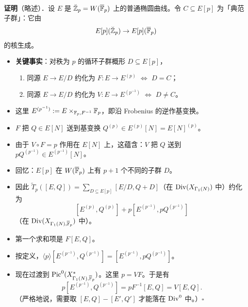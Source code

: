 \noindent\textbf{证明}（略述）．设 $E$ 是 $\breve{\mathbb{Z}}_p=W(\overline{\mathbb{F}}_p)$ 上的普通椭圆曲线。令 $C\subseteq E[p]$ 为「典范子群」：它由
\[
E[p](\breve{\mathbb{Z}}_p)\to E[p](\overline{\mathbb{F}}_p)
\]
的核生成。

\begin{itemize}
\item \textbf{关键事实}：对秩为 $p$ 的循环子群概形 $D\subseteq E[p]$，
\begin{enumerate}
\item[(1)] 同源 $E\to E/D$ 约化为 $F\colon E\to E^{(p)}$ $\iff$ $D=C$；
\item[(2)] 同源 $E\to E/D$ 约化为 $V\colon E\to E^{(p^{-1})}$ $\iff$ $D\ne C$。
\end{enumerate}
\item 这里 $E^{(p^{-1})}:=E\times_{\mathbb{F}_p,F^{-1}}\mathbb{F}_p$，即沿 Frobenius 的逆作基变换。
\item $F$ 把 $Q\in E[N]$ 送到基变换 $Q^{(p)}\in E^{(p)}[N]=E[N]^{(p)}$。
\item 由于 $V\circ F=p$ 作用在 $E[N]$ 上，这蕴含：$V$ 把 $Q$ 送到 $pQ^{(p^{-1})}\in E^{(p^{-1})}[N]$。
\item 回忆：$E[p]$ 在 $W(\overline{\mathbb{F}}_p)$ 上有 $p+1$ 个不同的子群 $D$。
\item 因此 $\tilde T_p([E,Q])=\sum_{D\subseteq E[p]}[E/D,Q+D]$（在 $\operatorname{Div}(X_{\Gamma_1(N)})$ 中）约化为
\[
[E^{(p)},Q^{(p)}]+p[E^{(p^{-1})},pQ^{(p^{-1})}]
\]
（在 $\operatorname{Div}(X_{\Gamma_1(N),\overline{\mathbb{F}}_p})$ 中）。
\item 第一个求和项是 $F[E,Q]$。
\item 按定义，$\langle p\rangle[E^{(p^{-1})},Q^{(p^{-1})}]=[E^{(p^{-1})},pQ^{(p^{-1})}]$。
\item 现在过渡到 $\operatorname{Pic}^0(X^*_{\Gamma_1(N),\overline{\mathbb{F}}_p})$。这里 $p=VF$。于是有
\[
p[E^{(p^{-1})},Q^{(p^{-1})}]=pF^{-1}[E,Q]=V[E,Q].
\]
（严格地说，需要取 $[E,Q]-[E',Q']$ 才能落在 $\operatorname{Div}^0$ 中。）\hfill$\square$
\end{itemize}
